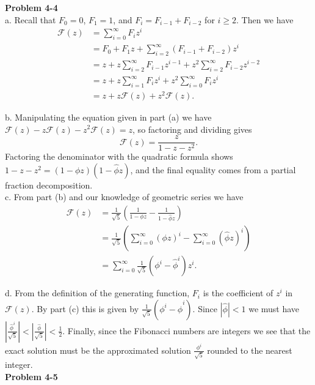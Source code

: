 \documentclass{article}
\begin{document}
\noindent\textbf{Problem 4-4}\\

a. Recall that $F_0 = 0$, $F_1 = 1$, and $F_i = F_{i-1} + F_{i-2}$ for $i \geq 2$.  Then we have
\begin{align*}
\mathcal{F}(z) &= \sum_{i=0}^\infty F_i z^i \\
&= F_0 + F_1z + \sum_{i=2}^\infty (F_{i-1} + F_{i-2})z^i \\
&= z + z\sum_{i=2}^\infty F_{i-1}z^{i-1} + z^2\sum_{i=2}^\infty F_{i-2}z^{i-2} \\
&= z + z\sum_{i=1}^\infty F_{i}z^{i} + z^2\sum_{i=0}^\infty F_{i}z^{i} \\
&= z + z\mathcal{F}(z) + z^2\mathcal{F}(z).
\end{align*}

b. Manipulating the equation given in part (a) we have $\mathcal{F}(z) - z\mathcal{F}(z) - z^2\mathcal{F}(z) = z$, so factoring and dividing gives 
\[ \mathcal{F}(z) = \frac{z}{1-z-z^2}.\]
Factoring the denominator with the quadratic formula shows $1 - z - z^2 = (1-\phi z)(1 - \hat{\phi} z)$, and the final equality comes from a partial fraction decomposition. \\

c. From part (b) and our knowledge of geometric series we have
\begin{align*}
 \mathcal{F}(z) &= \frac{1}{\sqrt{5}}\left(\frac{1}{1-\phi z} - \frac{1}{1-\hat{\phi}z}\right) \\
&= \frac{1}{\sqrt{5}}\left(\sum_{i=0}^\infty (\phi z)^i - \sum_{i=0}^\infty (\hat{\phi}z)^i \right) \\
&=\sum_{i=0}^\infty  \frac{1}{\sqrt{5}} (\phi^i - \hat{\phi}^i)z^i.
\end{align*}

d. From the definition of the generating function, $F_i$ is the coefficient of $z^i$ in $\mathcal{F}(z)$.  By part (c) this is given by $\frac{1}{\sqrt{5}} (\phi^i - \hat{\phi}^i)$. Since $|\hat{\phi}| < 1$ we must have $| \frac{\hat{\phi}^i}{\sqrt{5}} | < | \frac{\hat{\phi}}{\sqrt{5}} | < \frac{1}{2}$.  Finally, since the Fibonacci numbers are integers we see that the exact solution must be the approximated solution $\frac{\phi^i}{\sqrt{5}}$ rounded to the nearest integer. \\

\noindent\textbf{Problem 4-5}\\
\end{document}
